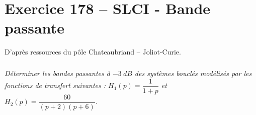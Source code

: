 \section*{Exercice 178 -- SLCI - Bande passante}
\setcounter{exo}{0}

D'après ressources du pôle Chateaubriand -- Joliot-Curie.



\subparagraph{}
\textit{Déterminer les bandes passantes à $\SI{-3}{dB}$ des systèmes bouclés modélisés par les fonctions de transfert
suivantes : $H_1(p)=\dfrac{1}{1+p}$ et $H_2(p)=\dfrac{60}{\left(p+2\right)\left(p+6\right)}$.}
\ifprof
\begin{corrige}

\end{corrige}
\else
\fi
